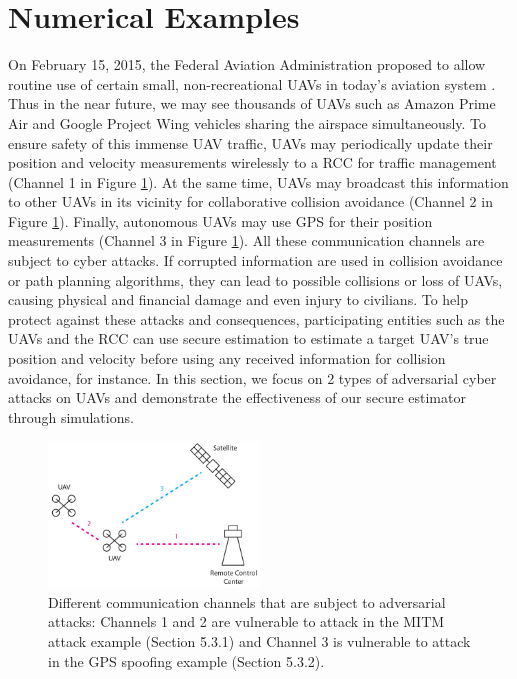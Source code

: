 \documentclass[../../thesis.tex]{subfiles}
\begin{document}


\section{Numerical Examples}\label{sec:examples}

On February 15, 2015, the Federal Aviation Administration proposed to allow routine use of certain small, non-recreational UAVs in today's aviation system \cite{faa}. Thus in the near future, we may see thousands of UAVs such as Amazon Prime Air \cite{Amazon} and Google Project Wing vehicles \cite{Google} sharing the airspace simultaneously. To ensure safety of this immense UAV traffic, UAVs may periodically update their position and velocity measurements wirelessly to a RCC for traffic management (Channel 1 in Figure \ref{fig:ex_uav_pic}). At the same time, UAVs may broadcast this information to other UAVs in its vicinity for collaborative collision avoidance (Channel 2 in Figure \ref{fig:ex_uav_pic}). Finally, autonomous UAVs may use GPS for their position measurements (Channel 3 in Figure \ref{fig:ex_uav_pic}). 
All these communication channels are subject to cyber attacks. 
If corrupted information are used in collision avoidance or path planning algorithms, they can lead to possible collisions or loss of UAVs, causing physical and financial damage and even injury to civilians.
To help protect against these attacks and consequences, participating entities such as the UAVs and the RCC can use secure estimation to estimate a target UAV's true position and velocity before using any received information for collision avoidance, for instance.
In this section, we focus on 2 types of adversarial cyber attacks on UAVs and demonstrate the effectiveness of our secure estimator through simulations.
\begin{figure}
\center
\includegraphics[width=0.5\textwidth]{chapters/se_linear/figures/qh/uav_pic.pdf}
\caption{Different communication channels that are subject to adversarial attacks: Channels 1 and 2 are vulnerable to attack in the MITM attack example (Section 5.3.1) and Channel 3 is vulnerable to attack in the GPS spoofing example (Section 5.3.2).}
\label{fig:ex_uav_pic}
\end{figure}
\end{document}
